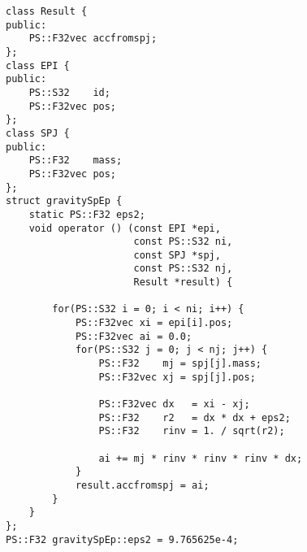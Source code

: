 \begin{lstlisting}[caption=calcForceSpEp]
class Result {
public:
    PS::F32vec accfromspj;
};
class EPI {
public:
    PS::S32    id;
    PS::F32vec pos;
};
class SPJ {
public:
    PS::F32    mass;
    PS::F32vec pos;
};
struct gravitySpEp {
    static PS::F32 eps2;
    void operator () (const EPI *epi,
                      const PS::S32 ni,
                      const SPJ *spj,
                      const PS::S32 nj,
                      Result *result) {
                      
        for(PS::S32 i = 0; i < ni; i++) {
            PS::F32vec xi = epi[i].pos;
            PS::F32vec ai = 0.0;
            for(PS::S32 j = 0; j < nj; j++) {
                PS::F32    mj = spj[j].mass;
                PS::F32vec xj = spj[j].pos;

                PS::F32vec dx   = xi - xj;
                PS::F32    r2   = dx * dx + eps2;
                PS::F32    rinv = 1. / sqrt(r2);

                ai += mj * rinv * rinv * rinv * dx;
            }
            result.accfromspj = ai;
        }
    }
};
PS::F32 gravitySpEp::eps2 = 9.765625e-4;
\end{lstlisting}

